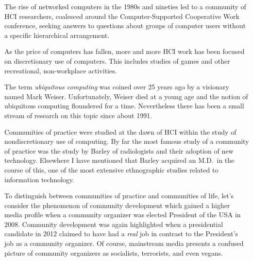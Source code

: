 \hypertarget{workgroup-cooperation}{%
\label{workgroup-cooperation}}

The rise of networked computers in the 1980s and nineties led to a
community of HCI researchers, coalesced around the Computer-Supported
Cooperative Work conference, seeking answers to questions about groups
of computer users without a specific hierarchical arrangement.

\hypertarget{discretionary-computing}{%
\label{discretionary-computing}}

As the price of computers has fallen, more and more HCI work has been
focused on discretionary use of computers. This includes studies of
games and other recreational, non-workplace activities.

\hypertarget{ubiquitous-computing}{%
\label{ubiquitous-computing}}

The term \emph{ubiquitous computing} was coined over 25 years ago by a
visionary named Mark Weiser. Unfortunately, Weiser died at a young age
and the notion of ubiquitous computing floundered for a time.
Nevertheless there has been a small stream of research on this topic
since about 1991.

\hypertarget{communities-of-practice}{%
\label{communities-of-practice}}

Communities of practice were studied at the dawn of HCI within the study
of nondiscretionary use of computing. By far the most famous study of a
community of practice was the study by Barley of radiologists and their
adoption of new technology. Elsewhere I have mentioned that Barley
acquired an M.D.~in the course of this, one of the most extensive
ethnographic studies related to information technology.

\hypertarget{communities-of-life}{%
\label{communities-of-life}}

To distinguish between communities of practice and communities of life,
let's consider the phenomenon of community development which gained a
higher media profile when a community organizer was elected President of
the USA in 2008. Community development was again highlighted when a
presidential candidate in 2012 claimed to have had a \emph{real} job in
contrast to the President's job as a community organizer. Of course,
mainstream media presents a confused picture of community organizers as
socialists, terrorists, and even vegans.

